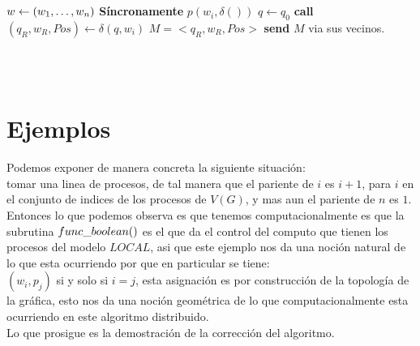\documentclass[10pt]{article}
\begin{document}
    \\\\
    \begin{algorithm}
        \begin{algorithmic}
            \STATE $w \gets (w_{1}, \mathellipsis, w_{n})$
            \STATE \textbf{Síncronamente}
                    \STATE $p(w_i,\delta())$
                    \STATE $q \gets q_{0}$
                      \STATE \textbf{call} $(q_{R},w_{R},Pos) \gets \delta(q,w_{i})$
                    \ENDWHILE
                    \ELSE
                       \STATE $M = <q_{R},w_{R}, Pos>$
                       \STATE \textbf{send} $M$ via sus vecinos.
                    \ENDIF
            \ENDFOR
        \end{algorithmic}
        \caption{$Simulate\char95 Algo \char95 TM(w,G,TM)$\label{lss}}
    \end{algorithm}
    \\\\
    \newpage
    \section{Ejemplos}\label{sec:ejemplos}
    Podemos exponer de manera concreta la siguiente situación: \\ tomar una linea de procesos, de tal manera que el pariente de $i$ es $i+1$, para $i$ en el
    conjunto de indices de los procesos de $V(G)$, y mas aun el pariente de $n$ es $1$.\\
    Entonces lo que podemos observa es que tenemos computacionalmente es que la subrutina
    $func \char95 boolean()$ es el que da el control del computo que tienen los procesos del modelo $LOCAL$,
    asi que este ejemplo nos da una noción natural de lo que esta ocurriendo por que en particular se tiene:\\
    $(w_{i},p_{j})$ si y solo si $i=j$, esta asignación es por construcción de la topología de la gráfica,
    esto nos da una noción geométrica de lo que computacionalmente esta ocurriendo en este algoritmo distribuido.
    \\
    Lo que prosigue es la demostración de la corrección del algoritmo.
    \\

\end{document}
